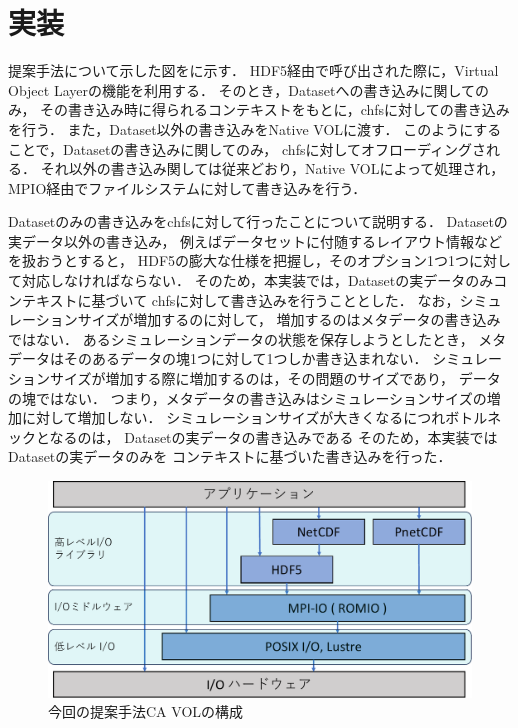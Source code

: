 \documentclass[submit,techrep,noauthor]{ipsj}
\begin{document}
\section{実装}
提案手法について示した図をに示す．
HDF5経由で呼び出された際に，Virtual Object Layerの機能を利用する．
そのとき，Datasetへの書き込みに関してのみ，
その書き込み時に得られるコンテキストをもとに，chfsに対しての書き込みを行う．
また，Dataset以外の書き込みをNative VOLに渡す．
このようにすることで，Datasetの書き込みに関してのみ，
chfsに対してオフローディングされる．
それ以外の書き込み関しては従来どおり，Native VOLによって処理され，
MPIO経由でファイルシステムに対して書き込みを行う．

Datasetのみの書き込みをchfsに対して行ったことについて説明する．
Datasetの実データ以外の書き込み，
例えばデータセットに付随するレイアウト情報などを扱おうとすると，
HDF5の膨大な仕様を把握し，そのオプション1つ1つに対して対応しなければならない．
そのため，本実装では，Datasetの実データのみコンテキストに基づいて
chfsに対して書き込みを行うこととした．
なお，シミュレーションサイズが増加するのに対して，
増加するのはメタデータの書き込みではない．
あるシミュレーションデータの状態を保存しようとしたとき，
メタデータはそのあるデータの塊1つに対して1つしか書き込まれない．
シミュレーションサイズが増加する際に増加するのは，その問題のサイズであり，
データの塊ではない．
つまり，メタデータの書き込みはシミュレーションサイズの増加に対して増加しない．
シミュレーションサイズが大きくなるにつれボトルネックとなるのは，
Datasetの実データの書き込みである
そのため，本実装ではDatasetの実データのみを
コンテキストに基づいた書き込みを行った．

\begin{figure}[t]
	\centering
	\includegraphics[page=8,width=\linewidth]{figure-crop.pdf}
	\caption{今回の提案手法CA VOLの構成}
	\label{fig:dividevol}
\end{figure}
\end{document}
